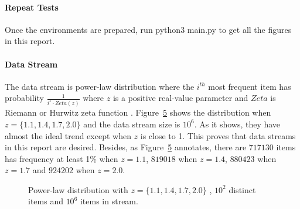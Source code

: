 \documentclass[10pt]{article}
\begin{document}
\paragraph{Repeat Tests}
Once the environments are prepared, run python3 main.py to get all the figures in this report.

\paragraph{Data Stream}
The data stream is power-law distribution where 
the $i^{th}$ most frequent item has probability $\frac{1}{i^{z} \cdot{} Zeta(z)}$
where $z$ is a positive real-value parameter and $Zeta$ is Riemann or Hurwitz zeta function \cite{zeta}. 
Figure~\ref{powerlaw} shows the distribution when $z = \{1.1, 1.4, 1.7, 2.0\}$ and the data stream size is $10^6$.
As it shows, they have almost the ideal trend except when $z$ is close to 1. 
This proves that data streams in this report are desired.
Besides, as Figure~\ref{powerlaw} annotates, there are $717130$ items has frequency at least 1\% when $z=1.1$,  
$819018$ when  $z=1.4$, $880423$ when $z=1.7$ and $924202$ when $z=2.0$.


\begin{figure}[!t]
     \begin{subfigure}[b]{0.5\textwidth}
          \centering
          \label{power-law-z-1.1-100-stream-1000000}
    \end{subfigure}
    \begin{subfigure}[b]{0.5\textwidth}
          \centering
          \label{power-law-z-1.4-100-stream-1000000}
    \end{subfigure}
    \begin{subfigure}[b]{0.5\textwidth}
          \centering
          \label{power-law-z-1.7-100-stream-1000000}
    \end{subfigure}
    \begin{subfigure}[b]{0.5\textwidth}
          \centering
          \label{power-law-z-2.0-100-stream-1000000}
    \end{subfigure}
 
    \caption{Power-law distribution with $z = \{1.1, 1.4, 1.7, 2.0\}$ , $10^2$ distinct items and $10^6$ items in stream.}
    \label{powerlaw}
\end{figure}
\end{document}
